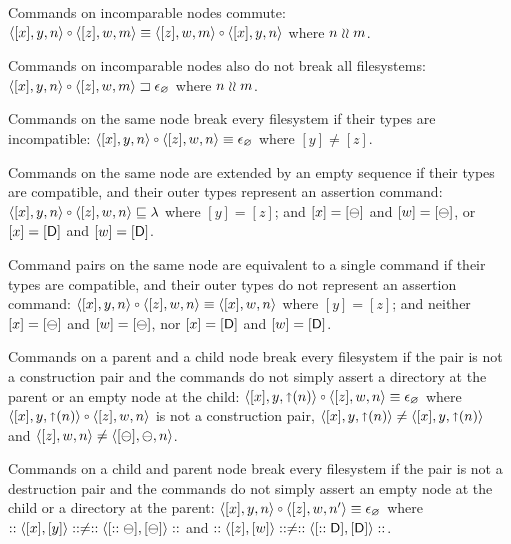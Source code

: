 \begin{mylem}
\begin{list}{\bf Rule~.}{}

\item[] %

\item{}
Commands on incomparable nodes commute:
$\cxynv\cc\czwmv \equiv \czwmv\cc\cxynv$ where $n\mathrel{\wr\wr} m$.

\item{}
Commands on incomparable nodes also do not break all filesystems:
$\wrksx{\cxynv\cc\czwmv}$ where $n\mathrel{\wr\wr} m$.

\item{}
Commands on the same node break every filesystem if their types are incompatible:
$\cxynv\cc\czwnv \equiv \cbrk$ where $[y]\ne [z]$.

\item{}
Commands on the same node are extended by an empty sequence if their types are compatible,
and their outer types represent an assertion command:
$\cxynv\cc\czwnv \eqext \emptyseq$ where $[y]=[z]$; and 
$[x]=[\ominus]$ and $[w]=[\ominus]$,
or $[x]=[\mathsf{D}]$ and $[w]=[\mathsf{D}]$.

\item{}
Command pairs on the same node are equivalent to a single command if their types are compatible,
and their outer types do not represent an assertion command:
$\cxynv\cc \czwnv \equiv \cxwnv$ where $[y]=[z]$; and
neither $[x]=[\ominus]$ and $[w]=[\ominus]$,
nor $[x]=[\mathsf{D}]$ and $[w]=[\mathsf{D}]$.

\item{}
Commands on a parent and a child node break every filesystem
if the pair is not a construction pair
and the commands do not simply assert a directory at the parent
or an empty node at the child:
$\cxypnv\cc\czwnv \equiv \cbrk$ where $\cxypnv\cc\czwnv$ is not a construction pair, 
$\langle{[x],y,\mathord{\shortuparrow}({n})}\rangle\neq\langle{[x],y,\mathord{\shortuparrow}({n})}\rangle$ and $\langle{[z],w,n}\rangle\neq\langle{[\ominus],\ominus,n}\rangle$.

\item{}
Commands on a child and parent node break every filesystem
if the pair is not a destruction pair
and the commands do not simply assert an empty node at the child
or a directory at the parent:
$\cxynv\cc\czwnnv \equiv \cbrk$ where $::\langle{[x],[y]}\rangle::\neq::\langle{[::\ominus],[\ominus]}\rangle::$ and $::\langle{[z],[w]}\rangle::\neq::\langle{[::\mathsf{D}],[\mathsf{D}]}\rangle::$.


\end{list}
\end{mylem}
